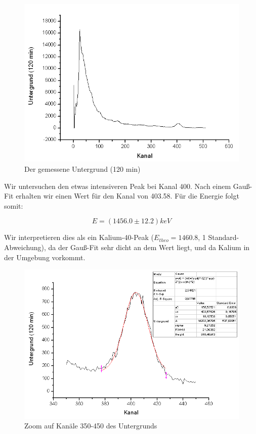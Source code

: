 \begin{figure}[H]
\centering \includegraphics[width = \textwidth]{auswertung/UG1.png}
\caption{Der gemessene Untergrund (120 min)}
\end{figure}

Wir untersuchen den etwas intensiveren Peak bei Kanal 400. Nach einem Gauß-Fit erhalten wir einen Wert für den Kanal von 403.58. Für die Energie folgt somit:

$$E = (1456.0 \pm 12.2) keV $$

Wir interpretieren dies als ein Kalium-40-Peak ($E_{theo} = 1460.8$, 1 Standard-Abweichung), da der Gauß-Fit sehr dicht an dem Wert liegt, und da Kalium in der Umgebung vorkommt.

\begin{figure}[H]
\centering \includegraphics[width = \textwidth]{auswertung/UG2.png}
\caption{Zoom auf Kanäle 350-450 des Untergrunds}
\end{figure}

